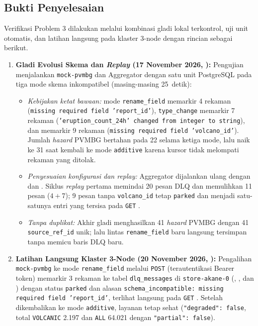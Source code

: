 \subsection{Bukti Penyelesaian}
Verifikasi Problem 3 dilakukan melalui kombinasi gladi lokal terkontrol, uji unit otomatis, dan latihan langsung pada klaster 3-node dengan rincian sebagai berikut.
\begin{enumerate}
    \item \textbf{Gladi Evolusi Skema dan \textit{Replay} (17 November 2026, ):} Pengujian menjalankan \texttt{mock-pvmbg} dan Aggregator dengan satu unit PostgreSQL pada tiga mode skema inkompatibel (masing-masing 25~detik):
    \begin{itemize}
        \item \textit{Kebijakan ketat bawaan:} mode \texttt{rename\_field} memarkir 4 rekaman (\texttt{missing required field 'report\_id'}), \texttt{type\_change} memarkir 7 rekaman (\texttt{'eruption\_count\_24h' changed from integer to string}), dan  memarkir 9 rekaman (\texttt{missing required field 'volcano\_id'}). Jumlah \textit{hazard} PVMBG bertahan pada 22 selama ketiga mode, lalu naik ke 31 saat kembali ke mode \texttt{additive} karena kursor tidak melompati rekaman yang ditolak.
        \item \textit{Penyesuaian konfigurasi dan replay:} Aggregator dijalankan ulang dengan  dan . Siklus \textit{replay} pertama memindai 20 pesan DLQ dan memulihkan 11 pesan ($4 + 7$); 9 pesan tanpa \texttt{volcano\_id} tetap \texttt{parked} dan menjadi satu-satunya entri yang tersisa pada \texttt{GET} .
        \item \textit{Tanpa duplikat:} Akhir gladi menghasilkan 41 \textit{hazard} PVMBG dengan 41 \texttt{source\_ref\_id} unik; lalu lintas \texttt{rename\_field} baru langsung tersimpan tanpa memicu baris DLQ baru.
    \end{itemize}
    \item \textbf{Latihan Langsung Klaster 3-Node (20 November 2026, ):} Pengalihan \texttt{mock-pvmbg} ke mode \texttt{rename\_field} melalui \texttt{POST}  (terautentikasi Bearer token) memarkir 3 rekaman ke tabel \texttt{dlq\_messages} di \texttt{store-akane-0} (, , dan ) dengan status \texttt{parked} dan alasan \texttt{schema\_incompatible: missing required field 'report\_id'}, terlihat langsung pada \texttt{GET} . Setelah dikembalikan ke mode \texttt{additive}, layanan tetap sehat (\texttt{"degraded": false}, total \texttt{VOLCANIC} 2.197 dan \texttt{ALL} 64.021 dengan \texttt{"partial": false}).

\end{enumerate}
